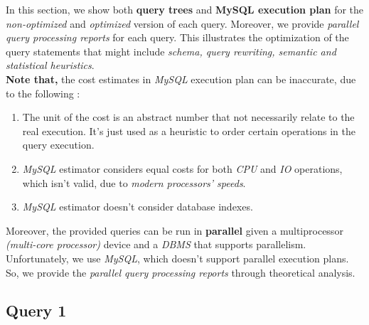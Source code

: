 In this section, we show both \textbf{query trees} and \textbf{MySQL execution plan} for the \emph{non-optimized} and \emph{optimized} version of each query. Moreover, we provide \emph{parallel query processing reports} for each query. This illustrates the optimization of the query statements that might include \emph{schema, query rewriting, semantic and statistical heuristics}. \\

\textbf{Note that,} the cost estimates in \emph{MySQL} execution plan can be inaccurate, due to the following :
\begin{enumerate}
    \item The unit of the cost is an abstract number that not necessarily relate to the real execution. It's just used as a heuristic to order certain operations in the query execution.
    \item \emph{MySQL} estimator considers equal costs for both \emph{CPU} and \emph{IO} operations, which isn't valid, due to \emph{modern processors' speeds}.
    \item \emph{MySQL} estimator doesn't consider database indexes.
\end{enumerate}

Moreover, the provided queries can be run in \textbf{parallel} given a multiprocessor \emph{(multi-core processor)} device and a \emph{DBMS} that supports parallelism. Unfortunately, we use \emph{MySQL}, which doesn't support parallel execution plans. So, we provide the \emph{parallel query processing reports} through theoretical analysis.

\subsection{Query 1}

